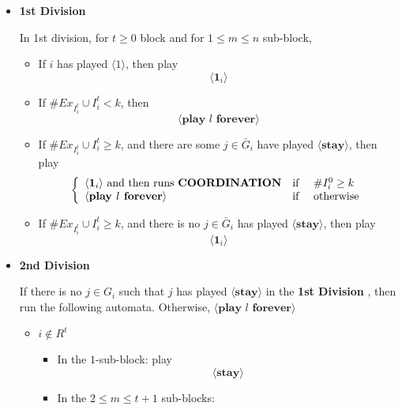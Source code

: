 \documentclass[12pt]{article}
\theoremstyle{remark}
\theoremstyle{remark}
\begin{document}
\begin{itemize}





\item \textbf{1st Division} 


In 1st division, for $t\geq 0$ block and for $1\leq m \leq n$ sub-block,
\begin{itemize}

\item If $i$ has played $\langle 1 \rangle$, then play
\[\langle \mathbf{1}_i \rangle\]

\item If $\# Ex_{I^{t}_i}\cup I^{t}_i<k$, then \[\langle\textbf{play $l$ forever}\rangle\]

\item If $\# Ex_{I^{t}_i}\cup I^{t}_i\geq k$, and there are some $j\in \bar{G}_i$ have played $\langle \textbf{stay} \rangle $, then play
\[\left\{
\begin{array}{l r l}      
    \langle \mathbf{1}_i \rangle \text{ and then runs \textbf{COORDINATION}} 	& \text{if } &\# I^{0}_i\geq k \\
    \langle\textbf{play $l$ forever}\rangle														&\text{if } 		& \text{otherwise}
\end{array}\right.
\]
\item If $\# Ex_{I^{t}_i}\cup I^{t}_i \geq k$, and there is no $j\in \bar{G}_i$ has played $\langle \textbf{stay} \rangle $, then play
\[\langle \mathbf{1}_i \rangle\]

\end{itemize}




\item \textbf{2nd Division} 

If there is no $j\in G_i$ such that $j$ has played $\langle \textbf{stay} \rangle$ in the \textbf{1st Division} , then run the following automata. Otherwise, $\langle\textbf{play $l$ forever}\rangle		$ 

\begin{itemize}
\item $i\notin R^t $
\begin{itemize}
\item In the $1$-sub-block: play
\[\langle \textbf{stay} \rangle \]


\item In the $2\leq m\leq t+1$ sub-blocks: 

\begin{enumerate}


\end{enumerate}
\end{itemize}
\end{itemize}
\end{itemize}
\end{document}
